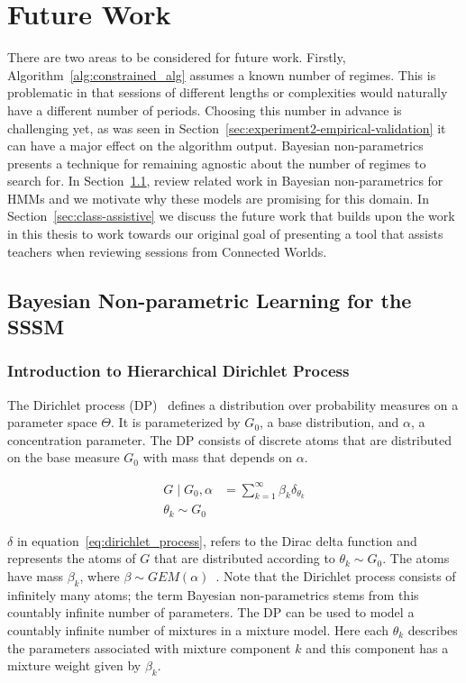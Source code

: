 \section{Future Work}
There are two areas to be considered for future work. Firstly, Algorithm~\ref{alg:constrained_alg} assumes a known number of regimes. This is problematic in that sessions of different lengths or complexities would naturally have a different number of periods. Choosing this number in advance is challenging yet, as was seen in Section~\ref{sec:experiment2-empirical-validation} it can have a major effect on the algorithm output. Bayesian non-parametrics presents a technique for remaining agnostic about the number of regimes to search for. In Section~\ref{sec:non-parameteric}, review related work in Bayesian non-parametrics for HMMs and we motivate why these models are promising for this domain. In Section~\ref{sec:class-assistive} we discuss the future work that builds upon the work in this thesis to work towards our original goal of presenting a tool that assists teachers when reviewing sessions from Connected Worlds.

\subsection{Bayesian Non-parametric Learning for the SSSM}\label{sec:non-parameteric}
\subsubsection{Introduction to Hierarchical Dirichlet Process}
The Dirichlet process (DP)~\citep{ferguson1973bayesian} defines a distribution over probability measures on a parameter space $\Theta$. It is parameterized by $G_0$, a base distribution, and $\alpha$, a concentration parameter. The DP consists of discrete atoms that are distributed on the base measure $G_0$ with mass that depends on $\alpha$.

\begin{equation}\label{eq:dirichlet_process}
  \begin{split}
    G \mid G_0, \alpha &= \sum\limits_{k=1}^{\infty} \beta_k \delta_{\theta_k} \\
    \theta_k \sim G_0
  \end{split}
\end{equation}

$\delta$ in equation~\ref{eq:dirichlet_process}, refers to the Dirac delta function and represents the atoms of $G$ that are distributed according to $\theta_k \sim G_0$. The atoms have mass $\beta_k$, where $\beta \sim GEM(\alpha)$~\citep{neal2000markov}. Note that the Dirichlet process consists of infinitely many atoms; the term Bayesian non-parametrics stems from this countably infinite number of parameters. The DP can be used to model a countably infinite number of mixtures in a mixture model. Here each $\theta_k$ describes the parameters associated with mixture component $k$ and this component has a mixture weight given by $\beta_k$.

